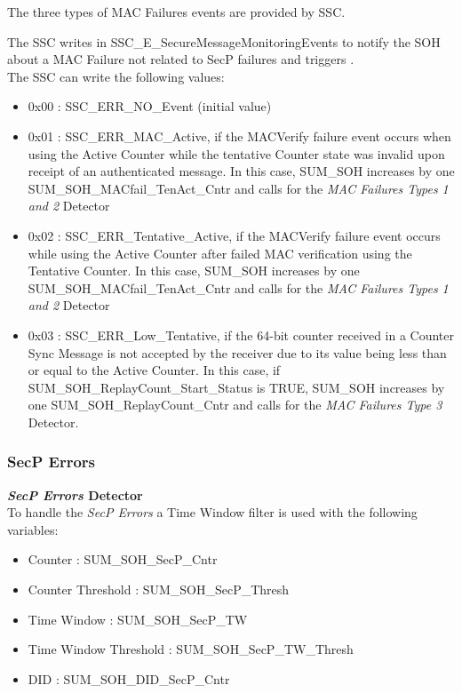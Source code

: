 {
	The three types of MAC Failures events are provided by SSC.

	The SSC writes in SSC_E_SecureMessageMonitoringEvents to notify the SOH about a MAC Failure not related to SecP failures and triggers .\\
	The SSC can write the following values:
	\begin{itemize}
		\item 0x00		:	SSC_ERR_NO_Event (initial value)
		\item 0x01		:	SSC_ERR_MAC_Active, if the MACVerify failure event occurs when using the Active Counter while the tentative Counter state was invalid upon receipt of an authenticated message. In this case, SUM_SOH  increases by one SUM_SOH_MACfail_TenAct_Cntr and calls  for the \textit{MAC Failures Types 1 and 2} Detector
		\item 0x02		:	SSC_ERR_Tentative_Active, if the MACVerify failure event occurs while using the Active Counter after failed MAC verification using the Tentative Counter. In this case, SUM_SOH increases by one SUM_SOH_MACfail_TenAct_Cntr and calls  for the \textit{MAC Failures Types 1 and 2} Detector
		\item 0x03		:	SSC_ERR_Low_Tentative, if the 64-bit counter received in a Counter Sync Message is not accepted by the receiver due to its value being less than or equal to the Active Counter. In this case, if SUM_SOH_ReplayCount_Start_Status is TRUE, SUM_SOH increases by one SUM_SOH_ReplayCount_Cntr and calls  for the \textit{MAC Failures Type 3} Detector.
	\end{itemize}
}
{
      
}


\subsubsection{SecP Errors}
{
    \textbf{\textit{SecP Errors} Detector}\\
    To handle the \textit{SecP Errors} a Time Window filter is used  with the following variables:
    \begin{itemize}
        \item Counter               : SUM_SOH_SecP_Cntr
        \item Counter Threshold     : SUM_SOH_SecP_Thresh
        \item Time Window           : SUM_SOH_SecP_TW
        \item Time Window Threshold : SUM_SOH_SecP_TW_Thresh
        \item DID                   : SUM_SOH_DID_SecP_Cntr
    \end{itemize}
}
{
        
}

